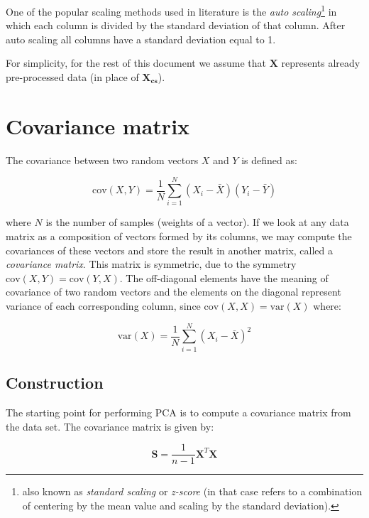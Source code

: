 \documentclass[10pt,twocolumn]{article}
\begin{document}
One of the popular scaling methods used in literature is the \textit{auto scaling}\footnote{also known as \textit{standard scaling} or \textit{z-score} (in that case refers to a combination of centering by the mean value and scaling by the standard deviation).} in which each column is divided by the standard deviation of that column. After auto scaling all columns have a standard deviation equal to 1.

For simplicity, for the rest of this document we assume that $\bm{X}$ represents already pre-processed data (in place of $\bm{X_{cs}}$).

\section{Covariance matrix}

The covariance between two random vectors $X$ and $Y$ is defined as:

\begin{equation}\label{eq:covariance-definition}
\text{cov}(X,Y) = \frac{1}{N} \sum_{i=1}^{N} (X_i - \bar{X}) (Y_i - \bar{Y})
\end{equation}

where $N$ is the number of samples (weights of a vector). If we look at any data matrix as a composition of vectors formed by its columns, we may compute the covariances of these vectors and store the result in another matrix, called a \textit{covariance matrix}. This matrix is symmetric, due to the symmetry $\text{cov}(X,Y) = \text{cov}(Y,X)$. The off-diagonal elements have the meaning of covariance of two random vectors and the elements on the diagonal represent variance of each corresponding column, since $\text{cov}(X,X) = \text{var}(X)$ where:

\begin{equation}\label{eq:variance-definition}
\text{var}(X) = \frac{1}{N} \sum_{i=1}^{N} (X_i - \bar{X})^2
\end{equation}

\subsection{Construction}

The starting point for performing PCA is to compute a covariance matrix from the data set. The covariance matrix is given by:

\begin{equation}\label{eq:cov-matrix}
\bm{S} = \frac{1}{n-1} \bm{X}^T \bm{X}
\end{equation}
\end{document}
